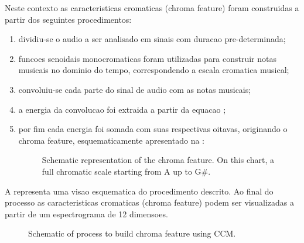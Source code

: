 \documentclass{article}
\begin{document}
	Neste contexto as caracteristicas cromaticas (chroma feature) foram construidas a partir dos seguintes procedimentos:
	\begin{enumerate}
		\item dividiu-se o audio a ser analisado em sinais com duracao pre-determinada;
		\item funcoes senoidais monocromaticas foram utilizadas para construir notas musicais no dominio do tempo, correspondendo a escala cromatica musical; 
		\item convoluiu-se cada parte do sinal de audio com as notas musicais;
		\item a energia da convolucao foi extraida a partir da equacao ;
		\item por fim cada energia foi somada com suas respectivas oitavas, originando o chroma feature, esquematicamente apresentado na :

		\begin{figure}[h]
		 \centerline{}
		 \caption{Schematic representation of the chroma feature. On this chart, a full chromatic scale starting from A up to G\#.}
		 \label{fig:chroma_feature}
		\end{figure}

	\end{enumerate}

	A  representa uma visao esquematica do procedimento descrito. Ao final do processo as caracteristicas cromaticas (chroma feature) podem ser visualizadas a partir de um espectrograma de 12 dimensoes.

	\begin{figure}[h]
	 \centerline{}
	 \caption{Schematic of process to build chroma feature using CCM.}
	 \label{fig:schematic}
	\end{figure}
\end{document}
